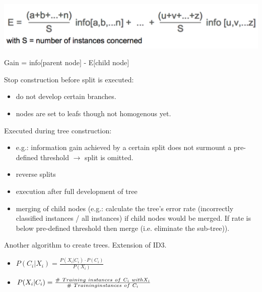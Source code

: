 \begin{breakbox}
\begin{breakbox}
\begin{center}
\includegraphics[width=.15\textwidth]{slides_images/entropy}
\end{center}
\end{breakbox}

\begin{breakbox}
\newline Gain = info[parent node] - E[child node]
\end{breakbox}
\end{breakbox}

\begin{breakbox}
\newline Stop construction before split is executed:
\begin{itemize}
	\item do not develop certain branches.
	\item nodes are set to leafs though not homogenous yet.
\end{itemize}
Executed during tree construction:
\begin{itemize}
	\item e.g.: information gain achieved by a certain split does not surmount a pre-defined threshold $\rightarrow$ split is omitted.
\end{itemize}
\end{breakbox}

\begin{breakbox}
\begin{itemize}
	\item reverse splits
	\item execution after full development of tree
	\item merging of child nodes (e.g.: calculate the tree's error rate (incorrectly classified instances / all instances) if child nodes would be merged. If rate is below pre-defined threshold then merge (i.e. eliminate the sub-tree)).
\end{itemize}
\end{breakbox}

\begin{breakbox}
 Another algorithm to create trees. Extension of
ID3.
\end{breakbox}

\begin{breakbox}
\begin{itemize}
	\item $P(C_i|X_i) = \frac{P(X_i|C_i)\cdot P(C_i)}{P(X_i)}$
	\item $P(X_i|C_i) =\\ \frac{\#\ Training\ instances\ of\ C_i\ with X_i}{\#\ Training instances\ of\ C_i}$
\end{itemize}
\end{breakbox}
